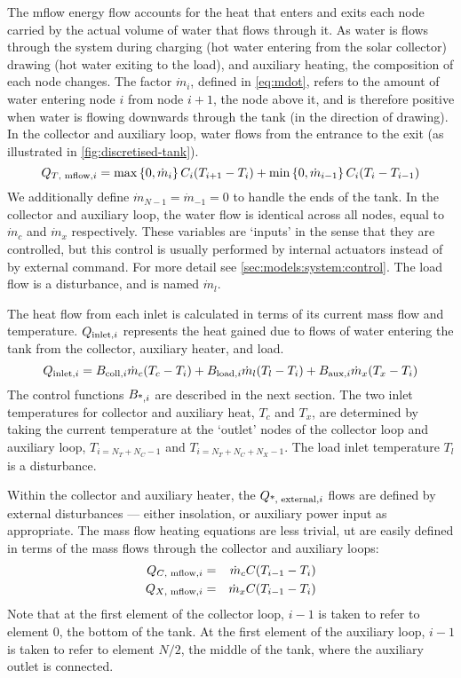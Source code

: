 The mflow energy flow accounts for the heat that enters and exits each node carried by the actual volume of water that flows through it.
As water is flows through the system during charging (hot water entering from the solar collector) drawing (hot water exiting to the load), and auxiliary heating, the composition of each node changes.
The factor $\dot{m}_i$, defined in \autoref{eq:mdot}, refers to the amount of water entering node $i$ from node $i+1$, the node above it, and is therefore positive when water is flowing downwards through the tank (in the direction of drawing).
In the collector and auxiliary loop, water flows from the entrance to the exit (as illustrated in \autoref{fig:discretised-tank}).
\begin{equation}
   \label{eq:tank-Q-mflow}
   Q_{\text{$T$, mflow}, i} = \max \left\{ 0, \dot{m}_i \right\}     C_i (T_{i+1} - T_i)
             + \min \left\{ 0, \dot{m}_{i-1} \right\} C_i (T_i - T_{i-1})
\end{equation}
We additionally define $\dot{m}_{N-1} = \dot{m}_{-1} = 0$ to handle the ends of the tank.
In the collector and auxiliary loop, the water flow is identical across all nodes, equal to $\dot{m}_c$ and $\dot{m}_x$ respectively.
These variables are `inputs' in the sense that they are controlled, but this control is usually performed by internal actuators instead of by external command.
For more detail see \autoref{sec:models:system:control}.
The load flow is a disturbance, and is named $\dot{m}_l$.

The heat flow from each inlet is calculated in terms of its current mass flow and temperature.
$Q_{\text{inlet}, i}$ represents the heat gained due to flows of water entering the tank from the collector, auxiliary heater, and load.
\begin{equation}
   \label{eq:Q-inlet}
   Q_{\text{inlet}, i} = B_{\text{coll}, i} \dot{m}_c (T_c - T_i)
             + B_{\text{load}, i} \dot{m}_l (T_l - T_i)
             + B_{\text{aux}, i} \dot{m}_x (T_x - T_i)
\end{equation}
The control functions $B_{\text{*}, i}$ are described in the next section.
The two inlet temperatures for collector and auxiliary heat, $T_c$ and $T_x$, are determined by taking the current temperature at the `outlet' nodes of the collector loop and auxiliary loop, $T_{i=N_T+N_C-1}$ and $T_{i=N_T+N_C+N_X-1}$.
The load inlet temperature $T_l$ is a disturbance.

Within the collector and auxiliary heater, the $Q_{\text{*, external}, i}$ flows are defined by external disturbances --- either insolation, or auxiliary power input as appropriate.
The mass flow heating equations are less trivial, ut are easily defined in terms of the mass flows through the collector and auxiliary loops:
\begin{eqnarray}
   Q_{\text{$C$, mflow}, i} &=& \dot{m}_c C (T_{i-1} - T_i)
   \\
   Q_{\text{$X$, mflow}, i} &=& \dot{m}_x C (T_{i-1} - T_i)
\end{eqnarray}
Note that at the first element of the collector loop, $i-1$ is taken to refer to element 0, the bottom of the tank.
At the first element of the auxiliary loop, $i-1$ is taken to refer to element $N/2$, the middle of the tank, where the auxiliary outlet is connected.

